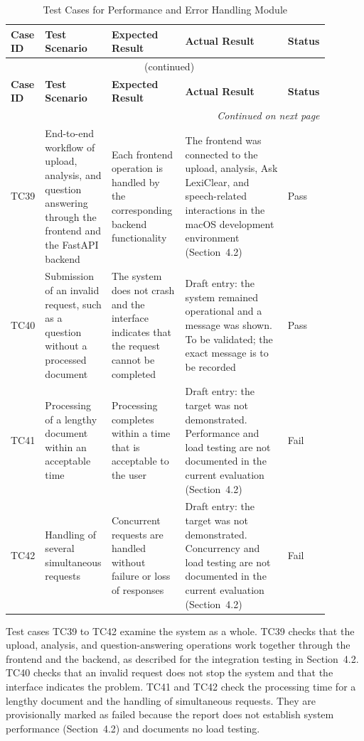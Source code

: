 \documentclass[12pt,a4paper,oneside]{report}
\begin{document}
{\footnotesize
\setlength{\tabcolsep}{3pt}
\renewcommand{\arraystretch}{1.15}
\begin{longtable}{|p{0.075\linewidth}|p{0.19\linewidth}|p{0.23\linewidth}|p{0.32\linewidth}|p{0.08\linewidth}|}
\caption{Test Cases for Performance and Error Handling Module}\label{tab:perf}\\
\hline
\textbf{Case ID} & \textbf{Test Scenario} & \textbf{Expected Result} & \textbf{Actual Result} & \textbf{Status}\\
\hline
\endfirsthead
\multicolumn{5}{c}{\tablename~\thetable{} (continued)}\\
\hline
\textbf{Case ID} & \textbf{Test Scenario} & \textbf{Expected Result} & \textbf{Actual Result} & \textbf{Status}\\
\hline
\endhead
\hline
\multicolumn{5}{r}{\emph{Continued on next page}}\\
\endfoot
\hline
\endlastfoot
TC39 & End-to-end workflow of upload, analysis, and question answering through the frontend and the FastAPI backend & Each frontend operation is handled by the corresponding backend functionality & The frontend was connected to the upload, analysis, Ask LexiClear, and speech-related interactions in the macOS development environment (Section~4.2) & Pass\\
\hline
TC40 & Submission of an invalid request, such as a question without a processed document & The system does not crash and the interface indicates that the request cannot be completed & Draft entry: the system remained operational and a message was shown. To be validated; the exact message is to be recorded & Pass\\
\hline
TC41 & Processing of a lengthy document within an acceptable time & Processing completes within a time that is acceptable to the user & Draft entry: the target was not demonstrated. Performance and load testing are not documented in the current evaluation (Section~4.2) & Fail\\
\hline
TC42 & Handling of several simultaneous requests & Concurrent requests are handled without failure or loss of responses & Draft entry: the target was not demonstrated. Concurrency and load testing are not documented in the current evaluation (Section~4.2) & Fail\\
\end{longtable}
}

Test cases TC39 to TC42 examine the system as a whole. TC39 checks that the upload, analysis, and question-answering operations work together through the frontend and the backend, as described for the integration testing in Section~4.2. TC40 checks that an invalid request does not stop the system and that the interface indicates the problem. TC41 and TC42 check the processing time for a lengthy document and the handling of simultaneous requests. They are provisionally marked as failed because the report does not establish system performance (Section~4.2) and documents no load testing.
\end{document}
